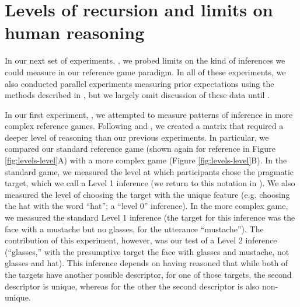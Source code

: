 \section{Levels of recursion and limits on human reasoning}
\label{sec:levels}

In our next set of experiments, , we probed limits on the kind of inferences we could measure in our reference game paradigm. In all of these experiments, we also conducted parallel experiments measuring prior expectations using the methods described in , but we largely omit discussion of these data until .

In our first experiment, , we attempted to measure patterns of inference in more complex reference games. Following  and , we created a matrix that required a deeper level of reasoning than our previous experiments. In particular, we compared our standard reference game (shown again for reference in Figure \ref{fig:levels-level}A) with a more complex game (Figure \ref{fig:levels-level}B). In the standard game, we measured the level at which participants chose the pragmatic target, which we call a Level 1 inference (we return to this notation in ). We also measured the level of choosing the target with the unique feature (e.g. choosing the hat with the word ``hat''; a ``level 0'' inference). In the more complex game, we measured the standard Level 1 inference (the target for this inference was the face with a mustache but no glasses, for the utterance ``mustache''). The contribution of this experiment, however, was our test of a Level 2 inference (``glasses,'' with the presumptive target the face with glasses and mustache, not glasses and hat). This inference depends on having reasoned that while both of the targets have another possible descriptor, for one of those targets, the second descriptor is unique, whereas for the other the second descriptor is also non-unique. 




